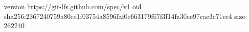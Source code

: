 version https://git-lfs.github.com/spec/v1
oid sha256:2367240759a80ce1f03754a8596faf0e663179f67f3f14fa30ee97cac3c71ce4
size 262240
